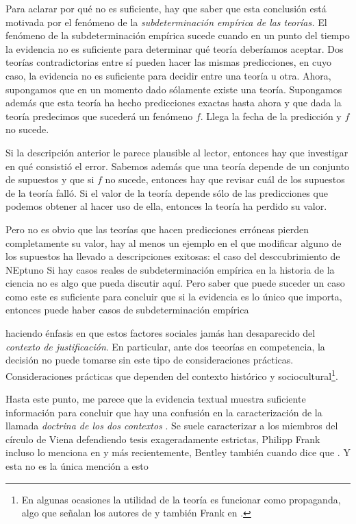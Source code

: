 Para aclarar por qué no es suficiente, hay que saber que esta conclusión está motivada por el fenómeno de la \emph{subdeterminación empírica de las teorías.}
El fenómeno de la subdeterminación empírica sucede cuando en un punto del tiempo la evidencia no es suficiente para determinar qué teoría deberíamos aceptar.
Dos teorías contradictorias entre sí pueden hacer las mismas predicciones, en cuyo caso, la evidencia no es suficiente para decidir entre una teoría u otra.
Ahora, supongamos que en un momento dado sólamente existe una teoría.
Supongamos además que esta teoría ha hecho predicciones exactas hasta ahora y que dada la teoría predecimos que sucederá un fenómeno $f$.
Llega la fecha de la predicción y $f$ no sucede.

Si la descripción anterior le parece plausible al lector, entonces hay que investigar en qué consistió el error.
Sabemos además que una teoría depende de un conjunto de supuestos y que si $f$ no sucede, entonces hay que revisar cuál de los supuestos de la teoría falló.
Si el valor de la teoría depende sólo de las predicciones que podemos obtener al hacer uso de ella, entonces la teoría ha perdido su valor.

Pero no es obvio que las teorías que hacen predicciones erróneas pierden completamente su valor, hay al menos un ejemplo en el que modificar alguno de los supuestos ha llevado a descripciones exitosas: el caso del desccubrimiento de NEptuno  
Si hay casos reales de subdeterminación empírica en la historia de la ciencia no es algo que pueda discutir aquí.
Pero saber que puede suceder un caso como este es suficiente para concluir que si la evidencia es lo único que importa, entonces puede haber casos de subdeterminación empírica 



haciendo énfasis en que estos factores sociales jamás han desaparecido del \emph{contexto de justificación}.
En particular, ante dos teeorías en competencia, la decisión no puede tomarse sin este tipo de consideraciones prácticas.
Consideraciones prácticas que dependen del contexto histórico y sociocultural\footnote{En algunas ocasiones la utilidad de la teoría es funcionar como propaganda, algo que señalan los autores de \parencite{Lewontin2017}  y también Frank en \parencite{}.}.

Hasta este punto, me parece que la evidencia textual muestra suficiente información para concluir que hay una confusión en la caracterización de la llamada \emph{doctrina de los dos contextos} \parencite{Yturbe1995}.
Se suele caracterizar a los miembros del círculo de Viena defendiendo tesis exageradamente estrictas, Philipp Frank incluso lo menciona en  y más recientemente, Bentley también cuando dice que .
Y esta no es la única mención a esto 

